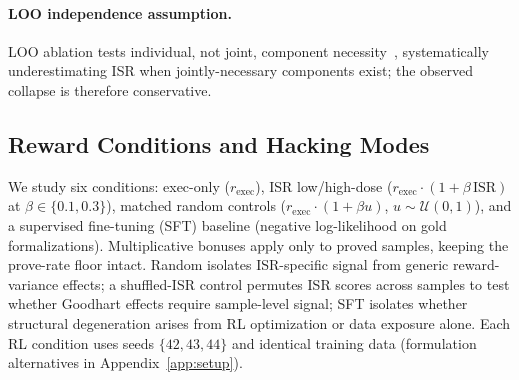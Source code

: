 \paragraph{LOO independence assumption.}
LOO ablation tests individual, not joint, component necessity~\citep{jia-harman-survey}, systematically underestimating ISR when jointly-necessary components exist; the observed collapse is therefore conservative.

\subsection{Reward Conditions and Hacking Modes}
\label{sec:rewards}
\label{sec:taxonomy-method}

We study six conditions: exec-only ($r_{\text{exec}}$), ISR low/high-dose ($r_{\text{exec}}\cdot(1{+}\beta\,\text{ISR})$ at $\beta\in\{0.1,0.3\}$), matched random controls ($r_{\text{exec}}\cdot(1{+}\beta u)$, $u\sim\mathcal{U}(0,1)$), and a supervised fine-tuning (SFT) baseline (negative log-likelihood on gold formalizations).
Multiplicative bonuses apply only to proved samples, keeping the prove-rate floor intact.
Random isolates ISR-specific signal from generic reward-variance effects; a shuffled-ISR control permutes ISR scores across samples to test whether Goodhart effects require sample-level signal; SFT isolates whether structural degeneration arises from RL optimization or data exposure alone.
Each RL condition uses seeds $\{42,43,44\}$ and identical training data (formulation alternatives in Appendix~\ref{app:setup}).

